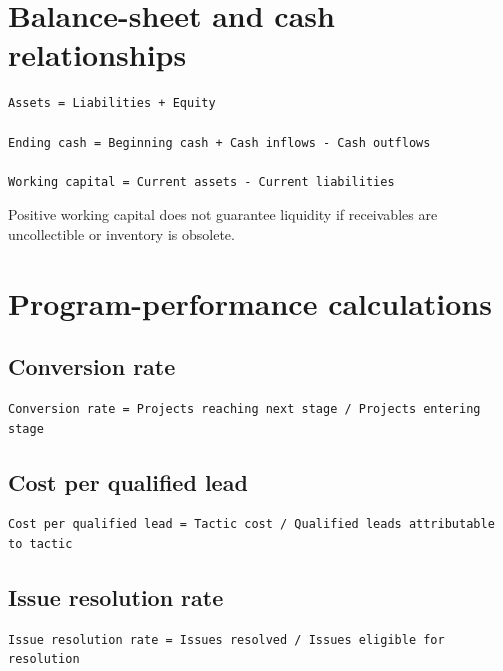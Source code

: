 \documentclass[11pt,letterpaper,oneside,openany]{book}
\begin{document}
\section[Balance-sheet and cash relationships]{Balance-sheet and cash relationships}
\begin{Verbatim}[fontsize=\small,breaklines=true,breakanywhere=true,frame=single,framesep=2mm]
Assets = Liabilities + Equity

Ending cash = Beginning cash + Cash inflows - Cash outflows

Working capital = Current assets - Current liabilities
\end{Verbatim}

Positive working capital does not guarantee liquidity if receivables are uncollectible or inventory is obsolete.


\section[Program-performance calculations]{Program-performance calculations}
\subsection[Conversion rate]{Conversion rate}
\begin{Verbatim}[fontsize=\small,breaklines=true,breakanywhere=true,frame=single,framesep=2mm]
Conversion rate = Projects reaching next stage / Projects entering stage
\end{Verbatim}

\subsection[Cost per qualified lead]{Cost per qualified lead}
\begin{Verbatim}[fontsize=\small,breaklines=true,breakanywhere=true,frame=single,framesep=2mm]
Cost per qualified lead = Tactic cost / Qualified leads attributable to tactic
\end{Verbatim}

\subsection[Issue resolution rate]{Issue resolution rate}
\begin{Verbatim}[fontsize=\small,breaklines=true,breakanywhere=true,frame=single,framesep=2mm]
Issue resolution rate = Issues resolved / Issues eligible for resolution
\end{Verbatim}
\end{document}
